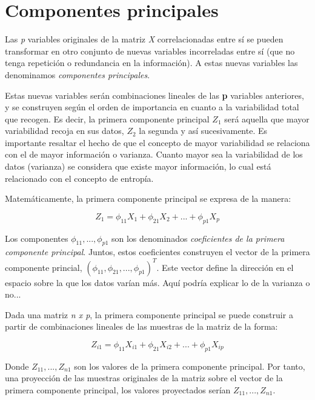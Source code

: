 \documentclass[12pt,a4paper,Spanish]{book}
\begin{document}
\section{Componentes principales}

Las \textit{p} variables originales de la matriz \textit{X} correlacionadas  entre sí se pueden transformar en otro conjunto de nuevas variables incorreladas entre sí (que no tenga repetición o redundancia en la información). A estas nuevas variables las denominamos \textit{componentes principales}.

Estas nuevas variables serán combinaciones lineales de las \textbf{p} variables anteriores, y se construyen según el orden de importancia en cuanto a la variabilidad total que recogen. Es decir, la primera componente principal $Z_1$ será aquella que mayor variabilidad recoja en sus datos, $Z_2$ la segunda y así sucesivamente. Es importante resaltar el hecho de que el concepto de mayor variabilidad se relaciona con el de mayor información o varianza. Cuanto mayor sea la variabilidad de los datos (varianza) se considera que existe mayor información, lo cual está relacionado con el concepto de entropía.

Matemáticamente, la primera componente principal se expresa de la manera:

\begin{equation}
Z_1=\phi_{11}X_1 + \phi_{21}X_2 + ... + \phi_{p1}X_p
\end{equation}

Los componentes $\phi_{11},...,\phi_{p1}$ son los denominados \textit{coeficientes de la primera componente principal}. Juntos, estos coeficientes construyen el vector de la primera componente princial, $(\phi_{11}, \phi_{21},...,\phi_{p1})^T$. Este vector define la dirección en el espacio sobre la que los datos varían más. Aquí podría explicar lo de la varianza o no...

Dada una matriz \textit{n x p}, la primera componente principal se puede construir a partir de combinaciones lineales de las muestras de la matriz de la forma:

\begin{equation}
Z_{i1}=\phi_{11}X_{i1} + \phi_{21}X_{i2} + ... + \phi_{p1}X_{ip}
\end{equation}

Donde $Z_{11},...,Z_{n1}$ son los valores de la primera componente principal. Por tanto, una proyección de las muestras originales de la matriz sobre el vector de la primera componente principal, los valores proyectados serían $Z_{11},...,Z_{n1}$. 
\end{document}

